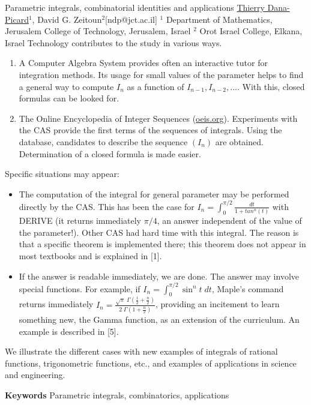 \begin{abstract_online}{Parametric integrals, combinatorial identities and applications}{%
        \underline{Thierry Dana-Picard}$^{1}$, David G. Zeitoun$^{2}$}{[ndp@jct.ac.il]
        }{%
        $^1$ Department of Mathematics, Jerusalem College of Technology, Jerusalem, Israel \newline{}$^2$ Orot Israel College, Elkana, Israel \newline{}}
Technology contributes to the study in various ways.
\begin{enumerate}
\item A Computer Algebra System provides often an interactive tutor for integration methods. Its usage for small values of the parameter helps to find a general way to compute $I_n$ as a function of $I_{n-1}, I_{n-2},...$. With this, closed formulas can be looked for.
\item The Online Encyclopedia of Integer Sequences (\url{oeis.org}). Experiments with the CAS provide the first terms of the sequences of integrals. Using the database, candidates to describe the sequence $(I_n)$ are obtained. Determination of a closed formula is made easier.
\end{enumerate}

Specific situations may appear:
 \begin{itemize}
 \item The computation of the integral for general parameter may be performed directly by the CAS. This has been the case for $I_n=\int_0^{\pi /2 } \frac {dt}{1+tan^n(t)}$ with DERIVE (it returns immediately $\pi / 4$, an answer independent of the value of the parameter!). Other CAS had hard time with this integral. The reason is that a specific theorem is implemented there; this theorem does not appear in most textbooks and is explained in [1].
 \item If the answer is readable immediately, we are done. The answer may involve special functions. For example, if $I_n=\int_0^{\pi / 2} \sin^n t \; dt$, Maple's command returns immediately $I_n=\frac{\sqrt{\pi} \; \Gamma (\frac 12 + \frac n2)}{2 \; \Gamma (1+ \frac n2)}$, providing an incitement to learn something new, the Gamma function, as an extension of the curriculum. An example is described in [5].
 \end{itemize}

We illustrate the different cases with new examples of integrals of rational functions, trigonometric functions, etc., and examples of applications in science and engineering.




\textbf{Keywords} \newline{} Parametric integrals, combinatorics, applications


\end{abstract_online}
